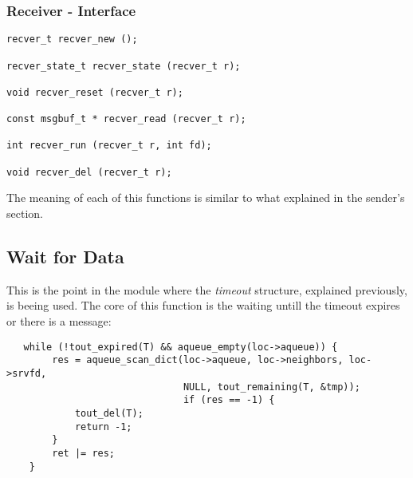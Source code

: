 \subsubsection{Receiver - Interface}
\begin{lstlisting}
recver_t recver_new ();

recver_state_t recver_state (recver_t r);

void recver_reset (recver_t r);

const msgbuf_t * recver_read (recver_t r);

int recver_run (recver_t r, int fd);

void recver_del (recver_t r);
\end{lstlisting}

The meaning of each of this functions is similar to what explained in the sender's section.

\subsection{Wait for Data}
This is the point in the module where the \textit{timeout} structure, explained previously, is beeing used.
The core of this function is the waiting untill the timeout expires or there is a message:
\begin{lstlisting}
   while (!tout_expired(T) && aqueue_empty(loc->aqueue)) {
        res = aqueue_scan_dict(loc->aqueue, loc->neighbors, loc->srvfd,
                               NULL, tout_remaining(T, &tmp));
                               if (res == -1) {
            tout_del(T);
            return -1;
        }
        ret |= res;
    }
\end{lstlisting}

